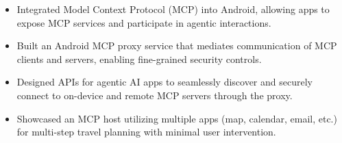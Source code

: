 


\begin{itemize}[nosep]
  \item Integrated Model Context Protocol (MCP) into Android, allowing apps to expose MCP services and participate in agentic interactions. 
  \item Built an Android MCP proxy service that mediates communication of MCP clients and servers, enabling fine-grained security controls.
  \item Designed APIs for agentic AI apps to seamlessly discover and securely connect to on-device and remote MCP servers through the proxy.
  \item Showcased an MCP host utilizing multiple apps (map, calendar, email, etc.) for multi-step travel planning with minimal user intervention.
\end{itemize}
